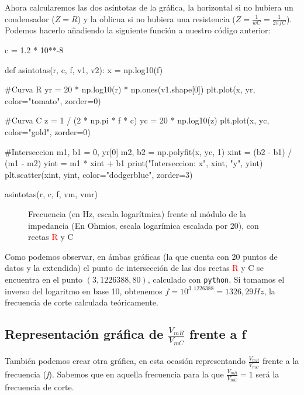 \documentclass[12pt, a4paper, titlepage]{article}
\newcommand{\code}[1]{\texttt{#1}} %
\begin{document}
  Ahora calcularemos las dos asíntotas de la gráfica, la horizontal si no hubiera un condensador ($Z = R$) y la oblicua si no hubiera una resistencia ($Z = \frac{1}{wC} = \frac{1}{2\pi fC}$). Podemos hacerlo añadiendo la siguiente función a nuestro código anterior:

  \begin{python}
    c = 1.2 * 10**-8

    def asintotas(r, c, f, v1, v2):
        x = np.log10(f)

        #Curva R
        yr = 20 * np.log10(r) * np.ones(v1.shape[0])
        plt.plot(x, yr, color="tomato", zorder=0)

        #Curva C
        z = 1 / (2 * np.pi * f * c)
        yc = 20 * np.log10(z)
        plt.plot(x, yc, color="gold", zorder=0)

        #Interseccion
        m1, b1 = 0, yr[0]
        m2, b2 = np.polyfit(x, yc, 1)
        xint = (b2 - b1) / (m1 - m2)
        yint = m1 * xint + b1
        print("Interseccion: x", xint, "y", yint)
        plt.scatter(xint, yint, color="dodgerblue", zorder=3)

    asintotas(r, c, f, vm, vmr)
  \end{python}

  \begin{figure}[H]
    \resizebox{\columnwidth}{!}{
    
    }
    \caption{Frecuencia (en Hz, escala logarítmica) frente al módulo de la impedancia (En Ohmios, escala logarímica escalada por 20), con rectas \textcolor{Red}{R} y \textcolor{Golden}{C}}
  \end{figure}

  Como podemos observar, en ámbas gráficas (la que cuenta con 20 puntos de datos y la extendida) el punto de intersección de las dos rectas \textcolor{Red}{R} y \textcolor{Golden}{C} se encuentra en el punto $(3,1226388, 80)$, calculado con \code{python}. Si tomamos el inverso del logaritmo en base 10, obtenemos $f = 10^{3,1226388} = 1326,29 Hz$, la frecuencia de corte calculada teóricamente.

  \subsection{Representación gráfica de $\frac{V_{mR}}{V_{mC}}$ frente a f}
  \label{sec:vmf}

  También podemos crear otra gráfica, en esta ocasión representando $\frac{V_{mR}}{V_{mC}}$ frente a la frecuencia (\textit{f}). Sabemos que en aquella frecuencia para la que $\frac{V_{mR}}{V_{mC}} = 1$ será la frecuencia de corte.
\end{document}
